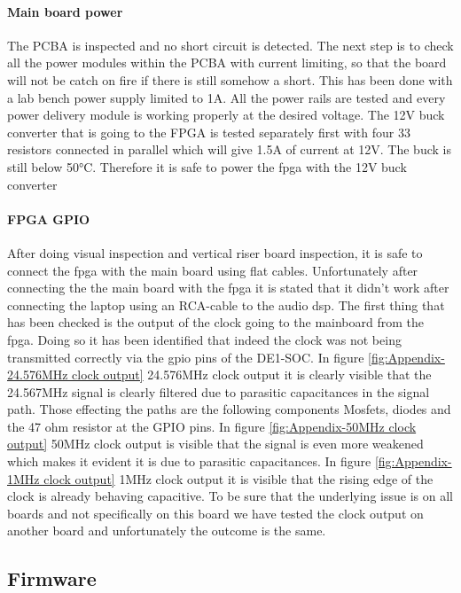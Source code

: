 \paragraph{Main board power}
The PCBA is inspected and no short circuit is detected. The next step is to check all the power modules within the PCBA with current limiting, so that the board will not be catch on fire if there is still somehow a short. This has been done with a lab bench power supply limited to 1A. All the power rails are tested and every power delivery module is working properly at the desired voltage. The 12V buck converter that is going to the FPGA is tested separately first with four 33 resistors connected in parallel which will give 1.5A of current at 12V. The buck is still below 50°C. Therefore it is safe to power the fpga with the 12V buck converter

\paragraph{FPGA GPIO}
After doing visual inspection and vertical riser board inspection, it is safe to connect the fpga with the main board using flat cables. Unfortunately after connecting the the main board with the fpga it is stated that it didn't work after connecting the laptop using an RCA-cable to the audio dsp. The first thing that has been checked is the output of the clock going to the mainboard from the fpga. Doing so it has been identified that indeed the clock was not being transmitted correctly via the gpio pins of the DE1-SOC. In figure \ref{fig:Appendix-24.576MHz clock output} 24.576MHz clock output it is clearly visible that the 24.567MHz signal is clearly filtered due to parasitic capacitances in the signal path. Those effecting the paths are the following components Mosfets, diodes and the 47 ohm resistor at the GPIO pins. In figure \ref{fig:Appendix-50MHz clock output} 50MHz clock output is visible that the signal is even more weakened which makes it evident it is due to parasitic capacitances. In figure \ref{fig:Appendix-1MHz clock output} 1MHz clock output it is visible that the rising edge of the clock is already behaving capacitive. To be sure that the underlying issue is on all boards and not specifically on this board we have tested the clock output on another board and unfortunately the outcome is the same.

\subsection{Firmware}
